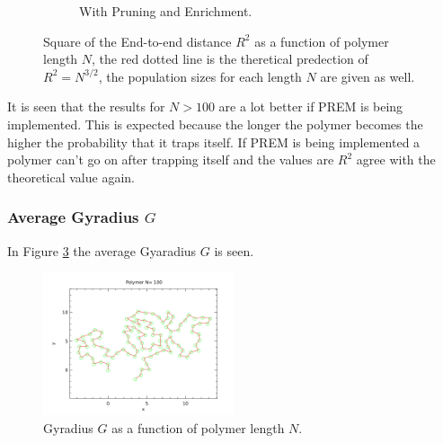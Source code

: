 \begin{figure}[htb]
\begin{subfigure}[b]{0.45\textwidth}
                \caption{With Pruning and Enrichment.}
                \label{fig:etoe_prem}
        \end{subfigure}
        \caption{Square of the End-to-end distance $R^2$ as a function of polymer length $N$, the red dotted line is the theretical predection of $R^2=N^{3/2}$, the population sizes for each length $N$ are given as well.}
        \label{fig:etoe}
\end{figure}

It is seen that the results for $N>100$ are a lot better if PREM is being implemented. This is expected because the longer the polymer becomes the higher the probability that it traps itself. If PREM is being implemented a polymer can't go on after trapping itself and the values are $R^2$ agree with the theoretical value again. 


\subsubsection*{Average Gyradius $G$}

In Figure \ref{fig:gyradius} the average Gyaradius $G$ is seen.


\begin{figure}[ht!]
\centering
\includegraphics[width=0.5\textwidth]{voorblad.pdf}
\caption{Gyradius $G$ as a function of polymer length $N$.}
\label{fig:gyradius}
\end{figure}